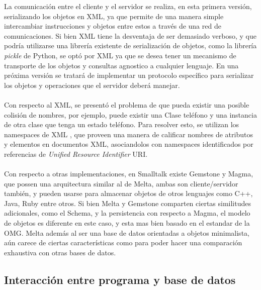 \documentclass{melta}
\begin{document}
La comunicación entre el cliente y el servidor se realiza, en esta primera versión, serializando los objetos en XML, ya que permite de una manera simple intercambiar instrucciones y objetos entre estos a través de una red de comunicaciones. Si bien XML tiene la desventaja de ser demasiado verboso, y que podría utilizarse una librería existente de serialización de objetos, como la librería \textit{pickle} de Python, se optó por XML ya que se desea tener un mecanismo de transporte de los objetos y consultas agnostico a cualquier lenguaje. En una próxima versión se tratará de implementar un protocolo específico para serializar los objetos y operaciones que el servidor deberá manejar.
\\\\
Con respecto al XML, se presentó el problema de que pueda existir una posible colisión de nombres, por ejemplo, puede existir una Clase teléfono y una instancia de otra clase que tenga un estado teléfono. Para resolver esto, se utilizan los namespaces de XML \cite{xml:BHL06}, que proveen una manera de calificar nombres de atributos y elementos en documentos XML, asociandolos con namespaces identificados por referencias de \textit{Unified Resource Identifier} URI.
\\\\
Con respecto a otras implementaciones, en Smalltalk existe Gemstone y Magma, que possen una arquitectura similar al de Melta, ambas son cliente/servidor también, y pueden usarse para almacenar objetos de otros lenguajes como C++, Java, Ruby entre otros. Si bien Melta y Gemstone comparten ciertas similitudes adicionales, como el Schema, y la persistencia con respecto a Magma, el modelo de objetos es diferente en este caso, y esta mas bien basado en el estandar de la OMG. Melta además al ser una base de datos orientadas a objetos minimalista, aún carece de ciertas características como para poder hacer una comparación exhaustiva con otras bases de datos. 

\subsection*{Interacción entre programa y base de datos}
\end{document}
